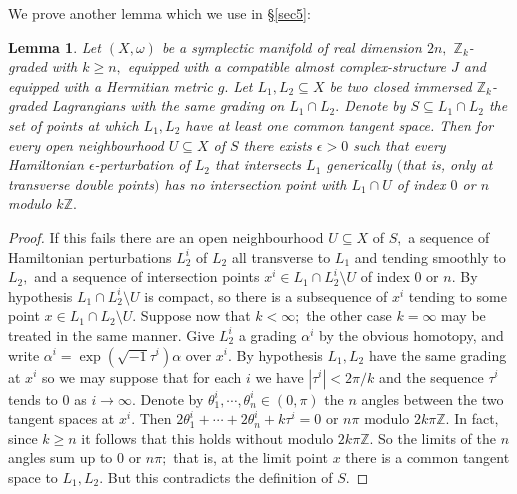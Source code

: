 \documentclass{article}
\theoremstyle{plain}%
\newtheorem{lem}[thm]{Lemma}
\theoremstyle{definition}
\numberwithin{equation}{section}
\numberwithin{figure}{section}
\def\l{\label}
\def\ge{\geqslant}
\def\Z{{\mathbin{\mathbb Z}}}
\def\al{\alpha}
\def\ep{\epsilon}
\def\th{\theta}
\def\om{\omega}
\def\ta{\tau}
\def\-{\setminus}
\def\iy{\infty}
\def\sb{\subseteq}
\begin{document}
We prove another lemma which we use in \S\ref{sec5}:
\begin{lem}\l{P0}
Let $(X,\om)$ be a symplectic manifold of real dimension $2n,$ $\Z_k$-graded with $k\ge n,$
equipped with a compatible almost complex-structure $J$ and equipped with a Hermitian metric $g.$
Let $L_1,L_2\sb X$ be two closed immersed $\Z_k$-graded Lagrangians with the same grading on $L_1\cap L_2.$
Denote by $S\sb L_1\cap L_2$ the set of points at which $L_1,L_2$ have at least one common tangent space.
Then for every open neighbourhood $U\sb X$ of $S$
there exists $\ep>0$ such that every Hamiltonian $\ep$-perturbation of $L_2$ that intersects $L_1$ generically $($that is, only at transverse double points$)$
has no intersection point with $L_1\cap U$ of index $0$ or $n$ modulo $k\Z.$
\end{lem}
\begin{proof}
If this fails there are an open neighbourhood $U\sb X$ of $S,$
a sequence of Hamiltonian perturbations $L_2^i$ of $L_2$ all transverse to $L_1$ and tending smoothly to $L_2,$
and a sequence of intersection points $x^i\in L_1\cap L_2^i\-U$ of index $0$ or $n.$
By hypothesis $L_1\cap L_2^i\-U$ is compact, so there is a subsequence of $x^i$ tending to some point $x\in L_1\cap L_2\-U.$
Suppose now that $k<\iy;$
the other case $k=\iy$ may be treated in the same manner.
Give $L_2^i$ a grading $\al^i$ by the obvious homotopy,
and write $\al^i=\exp(\sqrt{-1}\ta^i)\al$ over $x^i.$
By hypothesis $L_1,L_2$ have the same grading at $x^i$ so we may suppose that for each $i$ we have $|\ta^i|<2\pi/k$ and the sequence $\ta^i$ tends to $0$ as $i\to\iy.$
Denote by $\th_1^i,\cdots,\th_n^i\in(0,\pi)$ the $n$ angles between the two tangent spaces at $x^i.$
Then
$2\th_1^i+\cdots+2\th_n^i+k\ta^i=0\text{ or }n\pi\text{ modulo }2k\pi\Z.$
In fact, since $k\ge n$ it follows that this holds without modulo $2k\pi\Z.$
So the limits of the $n$ angles sum up to $0$ or $n\pi;$
that is, at the limit point $x$ there is a common tangent space to $L_1,L_2.$
But this contradicts the definition of $S.$
\end{proof}
\end{document}
